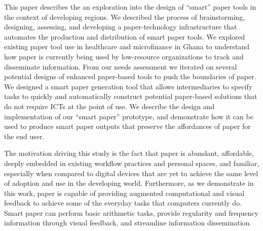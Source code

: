 \documentclass{sig-alternate}
\begin{document}
This paper describes the an exploration into the design of ``smart'' paper tools in the context of developing regions. We described the process of brainstorming, designing, assessing, and developing a paper-technology infrastructure that automates the production and distribution of smart paper tools. We explored existing paper tool use in healthcare and microfinance in Ghana to understand how paper is currently being used by low-resource organizations to track and disseminate information. From our needs assessment we iterated on several potential designs of enhanced paper-based tools to push the boundaries of paper. We designed a smart paper generation tool that allows intermediaries to specify tasks to quickly and automatically construct potential paper-based solutions that do not require ICTs at the point of use. We describe the design and implementation of our ``smart paper'' prototype, \nifty and demonstrate how it can be used to produce smart paper outputs that preserve the affordances of paper for the end user.

The motivation driving this study is the fact that paper is abundant, affordable, deeply embedded in existing workflow practices and personal spaces, and familiar, especially when compared to digital devices that are yet to achieve the same level of adoption and use in the developing world. Furthermore, as we demonstrate in this work, paper is capable of providing augmented computational and visual feedback to achieve some of the everyday tasks that computers currently do. Smart paper can perform basic arithmetic tasks, provide regularity and frequency information through visual feedback, and streamline information dissemination.



\end{document}
